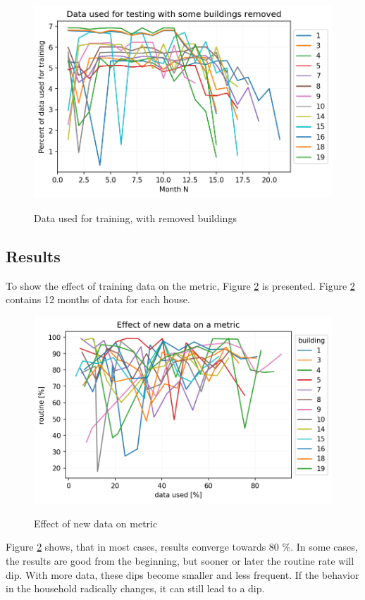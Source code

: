 \begin{figure}[H]
	\centering
	\caption{Data used for training, with removed buildings}
	\includegraphics[width=.7\textwidth]{Figures/EC/DYN/data_used_for_testing.png}
	\label{fig:data_used_for_testing}
\end{figure}

\subsection{Results}

To show the effect of training data on the metric, Figure \ref{fig:efect_of_data_on_metric} is presented.
Figure \ref{fig:efect_of_data_on_metric} contains 12 months of 
data for each house.

\begin{figure}[H]
	\centering
	\caption{Effect of new data on metric}
	\includegraphics[width=.7\textwidth]{Figures/EC/DYN/efect_of_data_on_metric.png}
	\label{fig:efect_of_data_on_metric}
\end{figure}

Figure \ref{fig:efect_of_data_on_metric} shows, that in most cases, results converge towards 80 \%. 
In some cases, the results are good from the beginning, but sooner or later the routine rate will dip. 
With more data, these dips become smaller and less frequent. 
If the behavior in the household radically changes, it can still lead to a dip.

